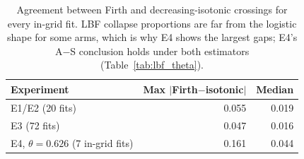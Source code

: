 \begin{table}[H]
\caption{Agreement between Firth and decreasing-isotonic crossings for every in-grid fit. LBF collapse proportions are far from the logistic shape for some arms, which is why E4 shows the largest gaps; E4's A$-$S conclusion holds under both estimators (Table~\ref{tab:lbf_theta}).}
\label{tab:isotonic}
\centering\small
\begin{tabular}{@{}lrr@{}}
\toprule
Experiment & Max $|$Firth$-$isotonic$|$ & Median \\
\midrule
E1/E2 (20 fits) & 0.055 & 0.019 \\
E3 (72 fits) & 0.047 & 0.016 \\
E4, $\theta=0.626$ (7 in-grid fits) & 0.161 & 0.044 \\
\bottomrule
\end{tabular}
\end{table}
